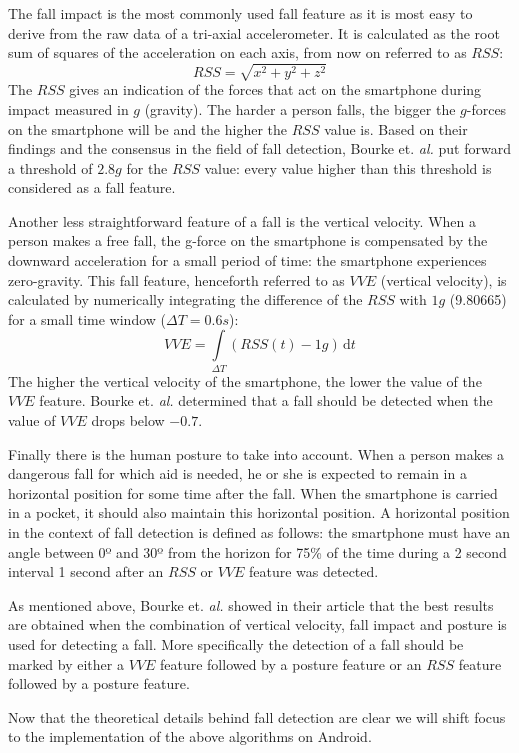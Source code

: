 \documentclass[a4paper, 10pt]{article}
\begin{document}
The fall impact is the most commonly used fall feature as it is most easy to derive from the raw data of a tri-axial accelerometer. It is calculated as the root sum of squares of the acceleration on each axis, from now on referred to as $RSS$: \[RSS = \sqrt{x^2 + y^2 + z^2}\] The $RSS$ gives an indication of the forces that act on the smartphone during impact measured in $g$ (gravity). The harder a person falls, the bigger the $g$-forces on the smartphone will be and the higher the $RSS$ value is. Based on their findings and the consensus in the field of fall detection, Bourke et. \textit{al.} put forward a threshold of $2.8g$ for the $RSS$ value: every value higher than this threshold is considered as a fall feature.

Another less straightforward feature of a fall is the vertical velocity. When a person makes a free fall, the g-force on the smartphone is compensated by the downward acceleration for a small period of time: the smartphone experiences zero-gravity. This fall feature, henceforth referred to as $VVE$ (vertical velocity), is calculated by numerically integrating the difference of the $RSS$ with $1g$ (9.80665) for a small time window ($\Delta T = 0.6s$): \[VVE = \int\limits_{\Delta T} \! (RSS(t) - 1g) \, \mathrm{d}t\] The higher the vertical velocity of the smartphone, the lower the value of the $VVE$ feature. Bourke et. \textit{al.} determined that a fall should be detected when the value of $VVE$ drops below $-0.7$.

Finally there is the human posture to take into account. When a person makes a dangerous fall for which aid is needed, he or she is expected to remain in a horizontal position for some time after the fall. When the smartphone is carried in a pocket, it should also maintain this horizontal position. A horizontal position in the context of fall detection is defined as follows: the smartphone must have an angle between 0º and 30º from the horizon for 75\% of the time during a 2 second interval 1 second after an $RSS$ or $VVE$ feature was detected.

As mentioned above, Bourke et. \textit{al.} showed in their article that the best results are obtained when the combination of vertical velocity, fall impact and posture is used for detecting a fall. More specifically the detection of a fall should be marked by either a $VVE$ feature followed by a posture feature or an $RSS$ feature followed by a posture feature.

Now that the theoretical details behind fall detection are clear we will shift focus to the implementation of the above algorithms on Android.
\end{document}
